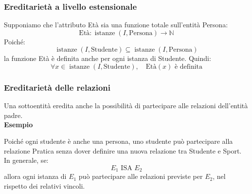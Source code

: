 \subsubsection*{Ereditarietà a livello estensionale}
Supponiamo che l'attributo Età sia
una funzione totale sull'entità Persona:
\[
\text{Età}:
\operatorname{istanze}(I,\text{Persona})
\longrightarrow \mathbb{N}
\]
Poiché:
\[
\operatorname{istanze}(I,\text{Studente})
\subseteq
\operatorname{istanze}(I,\text{Persona})
\]
la funzione Età è definita anche
per ogni istanza di Studente.
Quindi:
\[
\forall x \in
\operatorname{istanze}(I,\text{Studente}),
\quad
\text{Età}(x)\text{ è definita}
\]

\subsubsection*{Ereditarietà delle relazioni}
Una sottoentità eredita anche la possibilità
di partecipare alle relazioni
dell'entità padre.\\
\textcolor{verdeEsempio}{\textbf{Esempio}}
\begin{center}
\end{center}
\noindent
Poiché ogni studente è anche una persona,
uno studente può partecipare alla relazione
Pratica senza dover definire una nuova
relazione tra Studente e Sport.
In generale, se:
\[
E_1 \text{ ISA } E_2
\]
allora ogni istanza di $E_1$ può partecipare
alle relazioni previste per $E_2$,
nel rispetto dei relativi vincoli.

